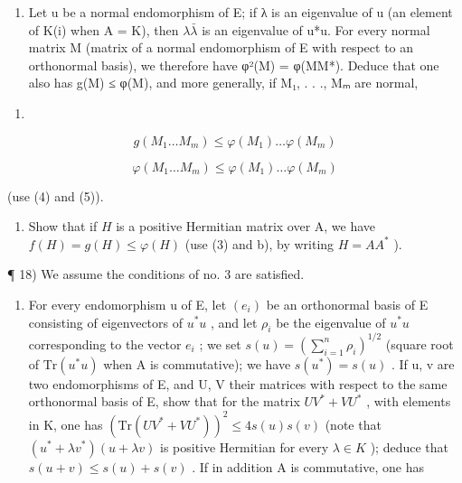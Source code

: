 \begin{enumerate}
\def\labelenumi{\alph{enumi})}
\setcounter{enumi}{1}
\tightlist
\item
  Let u be a normal endomorphism of E; if λ is an eigenvalue of u (an element of K(i) when A = K), then \(\lambda\bar{\lambda}\) is an eigenvalue of u*u. For every normal matrix M (matrix of a normal endomorphism of E with respect to an orthonormal basis), we therefore have φ²(M) = φ(MM*). Deduce that one also has g(M) ≤ φ(M), and more generally, if M₁, . . ., Mₘ are normal,
\end{enumerate}

\begin{enumerate}
\def\labelenumi{(\arabic{enumi})}
\setcounter{enumi}{5}
\tightlist
\item
\end{enumerate}

\[
g (M _ {1} \dots M _ {m}) \leqslant \varphi (M _ {1}) \dots \varphi (M _ {m})\tag{7}
\]

\[
\varphi (M _ {1} \dots M _ {m}) \leqslant \varphi (M _ {1}) \dots \varphi (M _ {m})
\]

(use (4) and (5)).

\begin{enumerate}
\def\labelenumi{\alph{enumi})}
\setcounter{enumi}{2}
\tightlist
\item
  Show that if \(H\) is a positive Hermitian matrix over A, we have \(f(H) = g(H) \leqslant \varphi(H)\) (use (3) and b), by writing \(H = AA^{*}\) ).
\end{enumerate}

¶ 18) We assume the conditions of no. 3 are satisfied.

\begin{enumerate}
\def\labelenumi{\alph{enumi})}
\tightlist
\item
  For every endomorphism u of E, let \((e_{i})\) be an orthonormal basis of E consisting of eigenvectors of \(u^{*}u\) , and let \(\rho_{i}\) be the eigenvalue of \(u^{*}u\) corresponding to the vector \(e_{i}\) ; we set \(s(u) = (\sum_{i=1}^{n} \rho_{i})^{1/2}\) (square root of \(\mathrm{Tr}(u^{*}u)\) when A is commutative); we have \(s(u^{*}) = s(u)\) . If u, v are two endomorphisms of E, and U, V their matrices with respect to the same orthonormal basis of E, show that for the matrix \(UV^{*} + VU^{*}\) , with elements in K, one has \((\mathrm{Tr}(UV^{*} + VU^{*}))^{2} \leqslant 4s(u)s(v)\) (note that \((u^{*} + \lambda v^{*})(u + \lambda v)\) is positive Hermitian for every \(\lambda \in K\) ); deduce that \(s(u + v) \leqslant s(u) + s(v)\) . If in addition A is commutative, one has
\end{enumerate}

